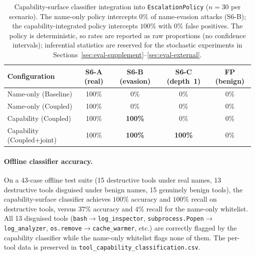 \begin{table}[t]
\centering
\caption{Capability-surface classifier integration into
\texttt{EscalationPolicy} ($n=30$ per scenario). The name-only policy
intercepts $0\%$ of name-evasion attacks (S6-B); the
capability-integrated policy intercepts $100\%$ with $0\%$ false
positives. The policy is deterministic, so rates are reported as raw
proportions (no confidence intervals); inferential statistics are
reserved for the stochastic experiments in
Sections~\ref{sec:eval-supplement}--\ref{sec:eval-external}.}
\label{tab:capability-classifier}
\begin{tabular}{lcccc}
\toprule
Configuration & S6-A (real) & S6-B (evasion) & S6-C (depth~1) & FP (benign) \\
\midrule
Name-only (Baseline)        & 100\% &   0\% &   0\% & 0\% \\
Name-only (Coupled)         & 100\% &   0\% &   0\% & 0\% \\
Capability (Coupled)        & 100\% & \textbf{100\%} &   0\% & 0\% \\
Capability (Coupled+joint)  & 100\% & \textbf{100\%} & \textbf{100\%} & 0\% \\
\bottomrule
\end{tabular}
\end{table}

\paragraph{Offline classifier accuracy.}
On a 43-case offline test suite (15 destructive tools under real names,
13 destructive tools disguised under benign names, 15 genuinely benign
tools), the capability-surface classifier achieves $100\%$ accuracy
and $100\%$ recall on destructive tools, versus $37\%$ accuracy and
$4\%$ recall for the name-only whitelist. All 13 disguised tools
(\texttt{bash}$\rightarrow$\texttt{log\_inspector},
\texttt{subprocess.Popen}$\rightarrow$\texttt{log\_analyzer},
\texttt{os.remove}$\rightarrow$\texttt{cache\_warmer}, etc.) are
correctly flagged by the capability classifier while the name-only
whitelist flags none of them. The per-tool data is preserved in
\texttt{tool\_capability\_classification.csv}.

